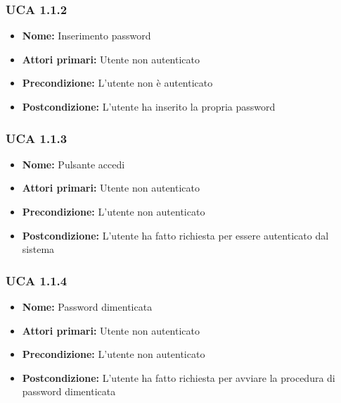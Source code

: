 \documentclass[a4paper, oneside, dvipsnames, table]{article} %
\begin{document}
\subsubsection{UCA 1.1.2}%
\begin{itemize}
\item \textbf{Nome:} Inserimento password
\item \textbf{Attori primari:} Utente non autenticato
\item \textbf{Precondizione:} L’utente non è autenticato
\item \textbf{Postcondizione:} L’utente ha inserito la propria password
\end{itemize}

\subsubsection{UCA 1.1.3}%
\begin{itemize}
\item \textbf{Nome:} Pulsante accedi
\item \textbf{Attori primari:} Utente non autenticato
\item \textbf{Precondizione:} L'utente non autenticato
\item \textbf{Postcondizione:} L'utente ha fatto richiesta per essere autenticato dal sistema 
\end{itemize}

\subsubsection{UCA 1.1.4}%
\begin{itemize}
\item \textbf{Nome:} Password dimenticata
\item \textbf{Attori primari:} Utente non autenticato
\item \textbf{Precondizione:}  L'utente non autenticato
\item \textbf{Postcondizione:} L'utente ha fatto richiesta per avviare la procedura di password dimenticata
\end{itemize}
\end{document}
